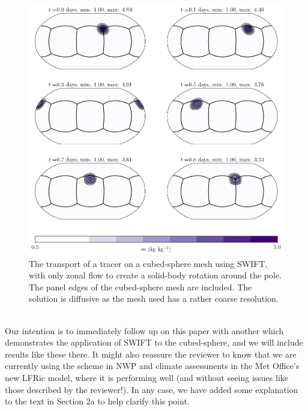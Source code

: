 \documentclass[11pt,a4paper]{article}
\begin{document}
\begin{figure}[h!]
    \centering
    \includegraphics[width=\textwidth]{swift_sbr.png}
    \caption{The transport of a tracer on a cubed-sphere mesh using SWIFT, with only zonal flow to create a solid-body rotation around the pole. The panel edges of the cubed-sphere mesh are included.
    The solution is diffusive as the mesh used has a rather coarse resolution.}
    \label{sbr}
\end{figure}
\\
Our intention is to immediately follow up on this paper with another which demonstrates the application of SWIFT to the cubed-sphere, and we will include results like these there. It might also reassure the reviewer to know that we are currently using the scheme in NWP and climate assessments in the Met Office's new LFRic model, where it is performing well (and without seeing issues like those described by the reviewer!). In any case, we have added some explanation to the text in Section 2a to help clarify this point.
\\
\\
\end{document}
